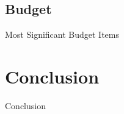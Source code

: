 \documentclass[14pt, aspectratio=169]{beamer}
\begin{document}
\subsection{Budget}
\begin{frame}{Most Significant Budget Items}
  
\end{frame}
\section{Conclusion}
\begin{frame}{Conclusion}
  
\end{frame}
\end{document}

